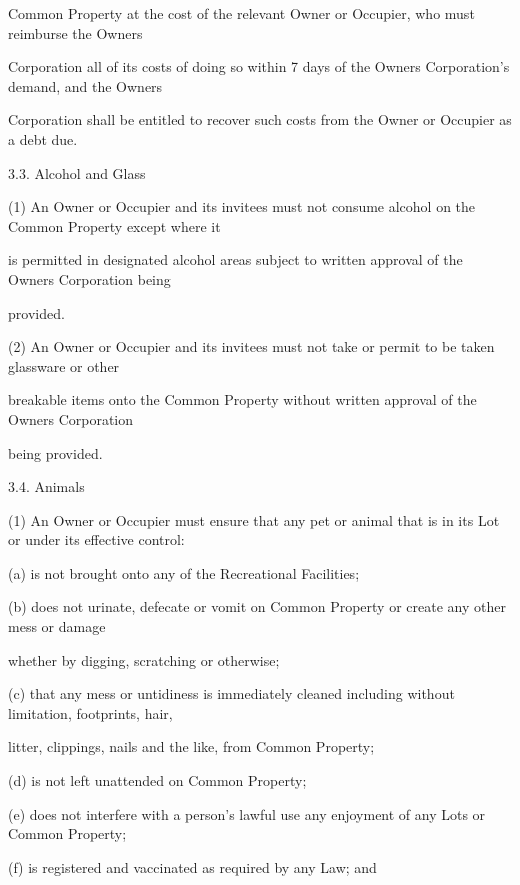 \documentclass{article}
\begin{document}
{\fontsize{10.02}{1}Common Property at the cost of the relevant Owner or Occupier, who must reimburse the Owners }

{\fontsize{10.02}{1}Corporation all of its costs of doing so within 7 days of the Owners Corporation’s demand, and the Owners }

{\fontsize{10.02}{1}Corporation shall be entitled to recover such costs from the Owner or Occupier as a debt due. }

{\fontsize{9.99}{1}3.3. Alcohol and Glass }

{\fontsize{9.962}{1}(1) An Owner or Occupier and its invitees must not consume alcohol on the Common Property except where it }

{\fontsize{10.02}{1}is permitted in designated alcohol areas subject to written approval of the Owners Corporation being }

{\fontsize{10.02}{1}provided. }

{\fontsize{9.962}{1}(2) An Owner or Occupier and its invitees must not take or permit to be taken glassware or other }

{\fontsize{10.02}{1}breakable items onto the Common Property without written approval of the Owners Corporation }

{\fontsize{10.02}{1}being provided. }

{\fontsize{9.99}{1}3.4. Animals }

{\fontsize{9.962}{1}(1) An Owner or Occupier must ensure that any pet or animal that is in its Lot or under its effective control: }

{\fontsize{9.962}{1}(a) is not brought onto any of the Recreational Facilities; }

{\fontsize{9.962}{1}(b) does not urinate, defecate or vomit on Common Property or create any other mess or damage }

{\fontsize{10.02}{1}whether by digging, scratching or otherwise; }

{\fontsize{9.962}{1}(c) that any mess or untidiness is immediately cleaned including without limitation, footprints, hair, }

{\fontsize{10.02}{1}litter, clippings, nails and the like,  from Common Property; }

{\fontsize{9.962}{1}(d) is not left unattended on Common Property; }

{\fontsize{9.962}{1}(e) does not interfere with a person’s lawful use any enjoyment of any Lots or Common Property; }

{\fontsize{9.962}{1}(f) is registered and vaccinated as required by any Law; and }
\end{document}
